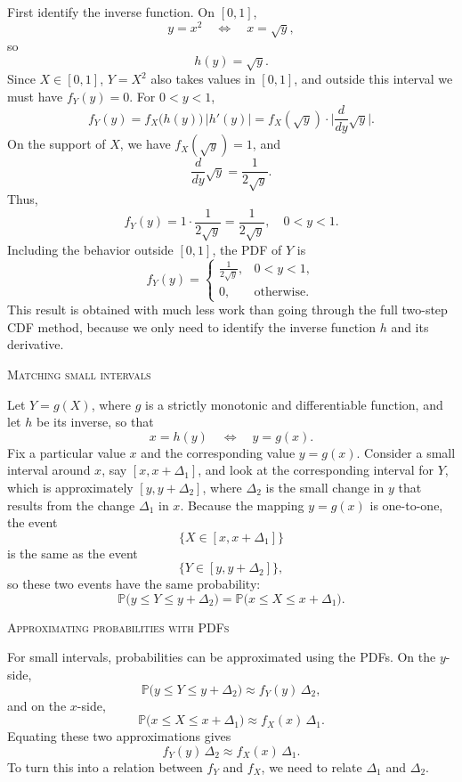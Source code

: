 First identify the inverse function.  
On \([0,1]\),
\[
y = x^{2}
\quad\Longleftrightarrow\quad
x = \sqrt{y},
\]
so
\[
h(y) = \sqrt{y}.
\]
Since \(X\in[0,1]\), \(Y = X^{2}\) also takes values in \([0,1]\), and outside this interval we must have \(f_Y(y)=0\).  
For \(0<y<1\),
\[
f_Y(y)
=
f_X\big(h(y)\big)\,\big|h'(y)\big|
=
f_X(\sqrt{y})\cdot\Big|\frac{d}{dy}\sqrt{y}\Big|.
\]
On the support of \(X\), we have \(f_X(\sqrt{y})=1\), and
\[
\frac{d}{dy}\sqrt{y}
=
\frac{1}{2\sqrt{y}}.
\]
Thus,
\[
f_Y(y)
=
1 \cdot \frac{1}{2\sqrt{y}}
=
\frac{1}{2\sqrt{y}},
\quad 0<y<1.
\]
Including the behavior outside \([0,1]\), the PDF of \(Y\) is
\[
f_Y(y)
=
\begin{cases}
\displaystyle \frac{1}{2\sqrt{y}}, & 0<y<1,\\[4pt]
0, & \text{otherwise}.
\end{cases}
\]
This result is obtained with much less work than going through the full two-step CDF method, because we only need to identify the inverse function \(h\) and its derivative.


\bigskip
\textsc{Matching small intervals}

Let \(Y = g(X)\), where \(g\) is a strictly monotonic and differentiable function, and let \(h\) be its inverse, so that
\[
x = h(y)
\quad\Longleftrightarrow\quad
y = g(x).
\]
Fix a particular value \(x\) and the corresponding value \(y = g(x)\).  
Consider a small interval around \(x\), say \([x, x + \Delta_1]\), and look at the corresponding interval for \(Y\), which is approximately \([y, y + \Delta_2]\), where \(\Delta_2\) is the small change in \(y\) that results from the change \(\Delta_1\) in \(x\).  
Because the mapping \(y = g(x)\) is one-to-one, the event
\[
\{X \in [x, x + \Delta_1]\}
\]
is the same as the event
\[
\{Y \in [y, y + \Delta_2]\},
\]
so these two events have the same probability:
\[
\mathbb{P}\big(y \le Y \le y + \Delta_2\big)
=
\mathbb{P}\big(x \le X \le x + \Delta_1\big).
\]

\textsc{Approximating probabilities with PDFs}

For small intervals, probabilities can be approximated using the PDFs.  
On the \(y\)-side,
\[
\mathbb{P}\big(y \le Y \le y + \Delta_2\big)
\approx
f_Y(y)\,\Delta_2,
\]
and on the \(x\)-side,
\[
\mathbb{P}\big(x \le X \le x + \Delta_1\big)
\approx
f_X(x)\,\Delta_1.
\]
Equating these two approximations gives
\[
f_Y(y)\,\Delta_2
\approx
f_X(x)\,\Delta_1.
\]
To turn this into a relation between \(f_Y\) and \(f_X\), we need to relate \(\Delta_1\) and \(\Delta_2\).

